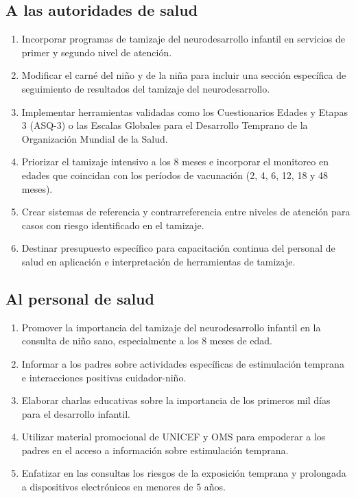 \documentclass[11pt,letterpaper]{report}
\begin{document}
\subsection*{A las autoridades de salud}
\begin{enumerate}
\item Incorporar programas de tamizaje del neurodesarrollo infantil en 
servicios de primer y segundo nivel de atención.

\item Modificar el carné del niño y de la niña para incluir una sección 
específica de seguimiento de resultados del tamizaje del neurodesarrollo.

\item Implementar herramientas validadas como los Cuestionarios Edades y 
Etapas 3 (ASQ-3) o las Escalas Globales para el Desarrollo Temprano de la 
Organización Mundial de la Salud.

\item Priorizar el tamizaje intensivo a los 8 meses e incorporar el 
monitoreo en edades que coincidan con los períodos de vacunación (2, 4, 6, 
12, 18 y 48 meses).

\item Crear sistemas de referencia y contrarreferencia entre niveles de 
atención para casos con riesgo identificado en el tamizaje.

\item Destinar presupuesto específico para capacitación continua del 
personal de salud en aplicación e interpretación de herramientas de 
tamizaje.
\end{enumerate}

\subsection*{Al personal de salud}
\begin{enumerate}
\item Promover la importancia del tamizaje del neurodesarrollo infantil en 
la consulta de niño sano, especialmente a los 8 meses de edad.

\item Informar a los padres sobre actividades específicas de estimulación 
temprana e interacciones positivas cuidador-niño.

\item Elaborar charlas educativas sobre la importancia de los primeros mil 
días para el desarrollo infantil.

\item Utilizar material promocional de UNICEF y OMS para empoderar a los 
padres en el acceso a información sobre estimulación temprana.

\item Enfatizar en las consultas los riesgos de la exposición temprana y 
prolongada a dispositivos electrónicos en menores de 5 años.
\end{enumerate}
\end{document}
